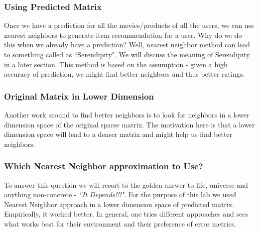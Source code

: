   \subsubsection{Using Predicted Matrix}
  Once we have a prediction for all the movies/products of all the users, we can use nearest neighbors to generate item recommendation for a user. Why do we do this when we already have a prediction? Well, nearest neighbor method can lead to something called as ``Serendipity". We will discuss the meaning of Serendipity in a later section. This method is based on the assumption - given a high accuracy of prediction, we might find better neighbors and thus better ratings.
  \subsubsection{Original Matrix in Lower Dimension}
  Another work around to find better neighbors is to look for neighbors in a lower dimension space of the original sparse matrix. The motivation here is that a lower dimension space will lead to a denser matrix and might help us find better neighbors.
  \subsubsection{Which Nearest Neighbor approximation to Use?}
  To answer this question we will resort to the golden answer to life, universe and anything non-concrete - \textit{``It Depends!!!"}. For the purpose of this lab we used Nearest Neighbor approach in a lower dimension space of predicted matrix. Empirically, it worked better. In general, one tries different approaches and sees what works best for their environment and their preference of error metrics.
